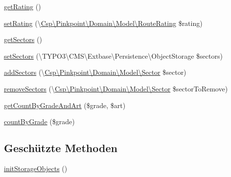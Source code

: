 \begin{DoxyCompactItemize}
\item 
\hyperlink{classCsp_1_1Pinkpoint_1_1Domain_1_1Model_1_1Climber_a3f212bd483cdf31902475c91730caef3}{get\+Rating} ()
\item 
\hyperlink{classCsp_1_1Pinkpoint_1_1Domain_1_1Model_1_1Climber_a603f3c42f7ae8ccff1b871d54e2b86dd}{set\+Rating} (\textbackslash{}\hyperlink{classCsp_1_1Pinkpoint_1_1Domain_1_1Model_1_1RouteRating}{Csp\textbackslash{}\+Pinkpoint\textbackslash{}\+Domain\textbackslash{}\+Model\textbackslash{}\+Route\+Rating} \$rating)
\item 
\hyperlink{classCsp_1_1Pinkpoint_1_1Domain_1_1Model_1_1Climber_a9c70bf6bf59852043d2ec7114855c26d}{get\+Sectors} ()
\item 
\hyperlink{classCsp_1_1Pinkpoint_1_1Domain_1_1Model_1_1Climber_a5ea7008ca262b4cc45d9efd973fee684}{set\+Sectors} (\textbackslash{}T\+Y\+P\+O3\textbackslash{}\+C\+M\+S\textbackslash{}\+Extbase\textbackslash{}\+Persistence\textbackslash{}\+Object\+Storage \$sectors)
\item 
\hyperlink{classCsp_1_1Pinkpoint_1_1Domain_1_1Model_1_1Climber_a540984529f615244e0c302fa6cc20dda}{add\+Sectors} (\textbackslash{}\hyperlink{classCsp_1_1Pinkpoint_1_1Domain_1_1Model_1_1Sector}{Csp\textbackslash{}\+Pinkpoint\textbackslash{}\+Domain\textbackslash{}\+Model\textbackslash{}\+Sector} \$sector)
\item 
\hyperlink{classCsp_1_1Pinkpoint_1_1Domain_1_1Model_1_1Climber_ab6ecf42eb408a612b04f4e78157e500c}{remove\+Sectors} (\textbackslash{}\hyperlink{classCsp_1_1Pinkpoint_1_1Domain_1_1Model_1_1Sector}{Csp\textbackslash{}\+Pinkpoint\textbackslash{}\+Domain\textbackslash{}\+Model\textbackslash{}\+Sector} \$sector\+To\+Remove)
\item 
\hyperlink{classCsp_1_1Pinkpoint_1_1Domain_1_1Model_1_1Climber_a75dd2c98c9897d18b4443f9f49139de4}{get\+Count\+By\+Grade\+And\+Art} (\$grade, \$art)
\item 
\hyperlink{classCsp_1_1Pinkpoint_1_1Domain_1_1Model_1_1Climber_ab2db9b7db3ebcbd4287378e5a78bbfd4}{count\+By\+Grade} (\$grade)
\end{DoxyCompactItemize}
\subsection*{Geschützte Methoden}
\begin{DoxyCompactItemize}
\item 
\hyperlink{classCsp_1_1Pinkpoint_1_1Domain_1_1Model_1_1Climber_a2f12d2caff7da99270c8d1cd50b14ed2}{init\+Storage\+Objects} ()
\end{DoxyCompactItemize}
